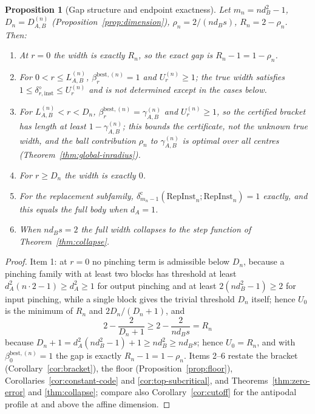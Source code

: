 \documentclass[11pt,a4paper]{article}
\newtheorem{proposition}[theorem]{Proposition}
\newcommand{\RepInst}{\mathrm{RepInst}}
\begin{document}
\begin{proposition}[Gap structure and endpoint exactness]
\label{prop:gap}
Let $m_n=nd_B^2-1$, $D_n=D_{A,B}^{(n)}$ (Proposition~\ref{prop:dimension}), $\rho_n=2/(nd_Bs)$, $R_n=2-\rho_n$. Then:
\begin{enumerate}[leftmargin=*,itemsep=2pt]
\item At $r=0$ the width is exactly $R_n$, so the exact gap is $R_n-1=1-\rho_n$.
\item For $0<r\le L_{A,B}^{(n)}$, $\beta_r^{\mathrm{best},(n)}=1$ and $U_r^{(n)}\ge1$; the true width satisfies $1\le\delta_{r,\mathrm{inst}}^{\diamond}\le U_r^{(n)}$ and is not determined except in the cases below.
\item For $L_{A,B}^{(n)}<r<D_n$, $\beta_r^{\mathrm{best},(n)}=\gamma_{A,B}^{(n)}$ and $U_r^{(n)}\ge1$, so the \emph{certified} bracket has length at least $1-\gamma_{A,B}^{(n)}$; this bounds the certificate, not the unknown true width, and the ball contribution $\rho_n$ to $\gamma_{A,B}^{(n)}$ is optimal over all centres (Theorem~\ref{thm:global-inradius}).
\item For $r\ge D_n$ the width is exactly $0$.
\item For the replacement subfamily, $\delta_{m_n-1}^{\mathrm c}(\RepInst_n;\RepInst_n)=1$ exactly, and this equals the full body when $d_A=1$.
\item When $nd_Bs=2$ the full width collapses to the step function of Theorem~\ref{thm:collapse}.
\end{enumerate}
\end{proposition}

\begin{proof}
Item 1: at $r=0$ no pinching term is admissible below $D_n$, because a pinching family with at least two blocks has threshold at least $d_A^2(n\cdot2-1)\ge d_A^2\ge1$ for output pinching and at least $2(nd_B^2-1)\ge2$ for input pinching, while a single block gives the trivial threshold $D_n$ itself; hence $U_0$ is the minimum of $R_n$ and $2D_n/(D_n+1)$, and
\[
2-\frac{2}{D_n+1}\ge 2-\frac{2}{nd_Bs}=R_n
\]
because $D_n+1=d_A^2(nd_B^2-1)+1\ge nd_B^2\ge nd_Bs$; hence $U_0=R_n$, and with $\beta_0^{\mathrm{best},(n)}=1$ the gap is exactly $R_n-1=1-\rho_n$. Items 2--6 restate the bracket (Corollary~\ref{cor:bracket}), the floor (Proposition~\ref{prop:floor}), Corollaries~\ref{cor:constant-code} and \ref{cor:top-subcritical}, and Theorems~\ref{thm:zero-error} and \ref{thm:collapse}; compare also Corollary~\ref{cor:cutoff} for the antipodal profile at and above the affine dimension.
\end{proof}
\end{document}
